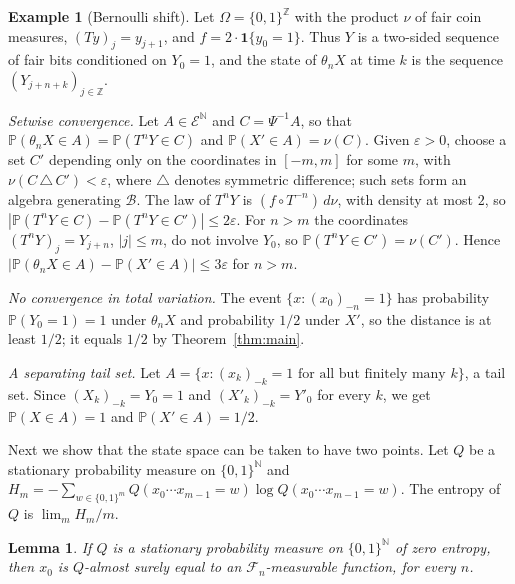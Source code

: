 \documentclass[11pt]{amsart}
\newtheorem{lemma}[theorem]{Lemma}
\theoremstyle{definition}
\newtheorem{example}[theorem]{Example}
\theoremstyle{remark}
\newcommand{\N}{\mathbb N}
\newcommand{\Z}{\mathbb Z}
\newcommand{\Prob}{\mathbb P}
\newcommand{\cE}{\mathcal E}
\newcommand{\cF}{\mathcal F}
\newcommand{\cB}{\mathcal B}
\newcommand{\one}{\mathbf 1}
\begin{document}
\begin{example}[Bernoulli shift]\label{ex:bernoulli}
Let $\Omega=\{0,1\}^\Z$ with the product $\nu$ of fair coin measures, $(Ty)_j=y_{j+1}$, and $f=2\cdot\one\{y_0=1\}$.
Thus $Y$ is a two-sided sequence of fair bits conditioned on $Y_0=1$, and the state of $\theta_nX$ at time $k$ is the
sequence $(Y_{j+n+k})_{j\in\Z}$.

\emph{Setwise convergence.} Let $A\in\cE^\N$ and $C=\Psi^{-1}A$, so that $\Prob(\theta_nX\in A)=\Prob(T^nY\in C)$ and
$\Prob(X'\in A)=\nu(C)$. Given $\varepsilon>0$, choose a set $C'$ depending only on the coordinates in $[-m,m]$ for some
$m$, with $\nu(C\,\triangle\,C')<\varepsilon$, where $\triangle$ denotes symmetric difference; such sets form an
algebra generating $\cB$. The law of $T^nY$ is
$(f\circ T^{-n})\,d\nu$, with density at most $2$, so
$|\Prob(T^nY\in C)-\Prob(T^nY\in C')|\le2\varepsilon$. For $n>m$ the coordinates $(T^nY)_j=Y_{j+n}$, $|j|\le m$, do not
involve $Y_0$, so $\Prob(T^nY\in C')=\nu(C')$. Hence $|\Prob(\theta_nX\in A)-\Prob(X'\in A)|\le3\varepsilon$ for $n>m$.

\emph{No convergence in total variation.} The event $\{x:(x_0)_{-n}=1\}$ has probability $\Prob(Y_0=1)=1$ under
$\theta_nX$ and probability $1/2$ under $X'$, so the distance is at least $1/2$; it equals $1/2$ by
Theorem~\ref{thm:main}.

\emph{A separating tail set.} Let $A=\{x:(x_k)_{-k}=1\text{ for all but finitely many }k\}$, a tail set. Since
$(X_k)_{-k}=Y_0=1$ and $(X'_k)_{-k}=Y'_0$ for every $k$, we get $\Prob(X\in A)=1$ and $\Prob(X'\in A)=1/2$.
\end{example}

Next we show that the state space can be taken to have two points. Let $Q$ be a stationary probability measure on
$\{0,1\}^\N$ and $H_m=-\sum_{w\in\{0,1\}^m}Q(x_0\cdots x_{m-1}=w)\log Q(x_0\cdots x_{m-1}=w)$. The entropy of $Q$ is
$\lim_mH_m/m$.

\begin{lemma}\label{lem:zeroentropy}
If $Q$ is a stationary probability measure on $\{0,1\}^\N$ of zero entropy, then $x_0$ is $Q$-almost surely equal to an
$\cF_n$-measurable function, for every $n$.
\end{lemma}
\end{document}
